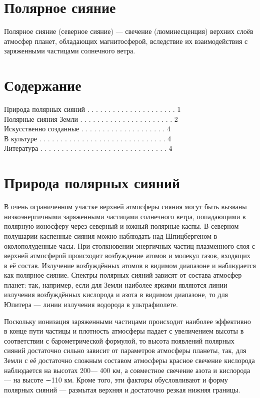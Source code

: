\documentclass[a4paper,14pt]{article}
\begin{document}
\section{Полярное сияние}
Полярное сияние (северное сияние) — свечение (люминесценция)
верхних слоёв атмосфер планет, обладающих магнитосферой, вследствие
их взаимодействия с заряженными частицами солнечного ветра.

\section{Содержание}
Природа полярных сияний . . . . . . . . . . . . . . . . . . . . . 1\\
Полярные сияния Земли . . . . . . . . . . . . . . . . . . . . . . 2\\
Искусственно созданные . . . . . . . . . . . . . . . . . . . . 4\\
В культуре . . . . . . . . . . . . . . . . . . . . . . . . . . . . . . 4\\
Литература . . . . . . . . . . . . . . . . . . . . . . . . . . . . . . 4

\section{Природа полярных сияний}
В очень ограниченном участке верхней атмосферы сияния могут быть
вызваны низкоэнергичными заряженными частицами солнечного ветра,
попадающими в полярную ионосферу через северный и южный полярные каспы. В северном полушарии каспенные сияния можно наблюдать
над Шпицбергеном в околополуденные часы.
При столкновении энергичных частиц плазменного слоя с верхней
атмосферой происходит возбуждение атомов и молекул газов, входящих
в её состав. Излучение возбуждённых атомов в видимом диапазоне и
наблюдается как полярное сияние. Спектры полярных сияний зависят
от состава атмосфер планет: так, например, если для Земли наиболее
яркими являются линии излучения возбуждённых кислорода и азота в
видимом диапазоне, то для Юпитера — линии излучения водорода в
ультрафиолете.

Поскольку ионизация заряженными частицами происходит наиболее
эффективно в конце пути частицы и плотность атмосферы падает с увеличением высоты в соответствии с барометрической формулой, то высота
появлений полярных сияний достаточно сильно зависит от параметров
атмосферы планеты, так, для Земли с её достаточно сложным составом
атмосферы красное свечение кислорода наблюдается на высотах 200—
400 км, а совместное свечение азота и кислорода — на высоте ∼110 км.
Кроме того, эти факторы обусловливают и форму полярных сияний —
размытая верхняя и достаточно резкая нижняя границы.
\end{document}
